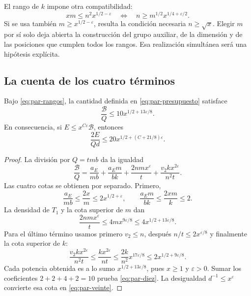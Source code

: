 El rango de $k$ impone otra compatibilidad:
\begin{equation}
 xm\le n^2x^{1/2-\varepsilon}
 \quad\Longleftrightarrow\quad
 n\ge m^{1/2}x^{1/4+\varepsilon/2}.
 \label{eq:par-compatibilidad}
\end{equation}
Si se usa también $m\ge x^{1/2-\varepsilon}$, resulta la condición
necesaria $n\ge\sqrt{x}$. Elegir $m$ por sí solo deja abierta la
construcción del grupo auxiliar, de la dimensión y de las posiciones
que cumplen todos los rangos. Esa realización simultánea será una
hipótesis explícita.

\subsection{La cuenta de los cuatro términos}

\begin{lema}
\label{lem:par-presupuesto}
Bajo \eqref{eq:par-rangos}, la cantidad definida en
\eqref{eq:par-presupuesto} satisface
\begin{equation}
 \frac{\mathcal B}{Q}\le10x^{1/2+13\varepsilon/8}.
 \label{eq:par-diez}
\end{equation}
En consecuencia, si $E\le x^{C\varepsilon}\mathcal B$, entonces
\begin{equation}
 \frac{2E}{Qd}\le20x^{1/2+(C+21/8)\varepsilon}.
 \label{eq:par-veinte}
\end{equation}
\end{lema}

\begin{proof}
La división por $Q=tmb$ da la igualdad
\begin{equation}
 \frac{\mathcal B}{Q}
 =\frac{a_E}{mb}+\frac{a_Em}{bk}
     +\frac{2nmx^\varepsilon}{t}
     +\frac{v_2kx^{2\varepsilon}}{n^2t}.
 \label{eq:par-cuatro}
\end{equation}
Las cuatro cotas se obtienen por separado. Primero,
\[
 \frac{a_E}{mb}\le\frac{2x}{m}\le2x^{1/2+\varepsilon},
 \qquad
 \frac{a_Em}{bk}\le\frac{2xm}{k}\le2.
\]
La densidad de $T_1$ y la cota superior de $m$ dan
\[
 \frac{2nmx^\varepsilon}{t}
 \le4m x^{9\varepsilon/8}
 \le4x^{1/2+13\varepsilon/8}.
\]
Para el último término usamos primero $v_2\le n$, después
$n/t\le2x^{\varepsilon/8}$ y finalmente la cota superior de $k$:
\[
 \frac{v_2kx^{2\varepsilon}}{n^2t}
 \le\frac{kx^{2\varepsilon}}{nt}
 \le\frac{2k}{n^2}x^{17\varepsilon/8}
 \le2x^{1/2+9\varepsilon/8}.
\]
Cada potencia obtenida es a lo sumo
$x^{1/2+13\varepsilon/8}$, pues $x\ge1$ y $\varepsilon>0$.
Sumar los coeficientes $2+2+4+2=10$ prueba
\eqref{eq:par-diez}. La desigualdad
$d^{-1}\le x^\varepsilon$ convierte esa cota en
\eqref{eq:par-veinte}.
\end{proof}

